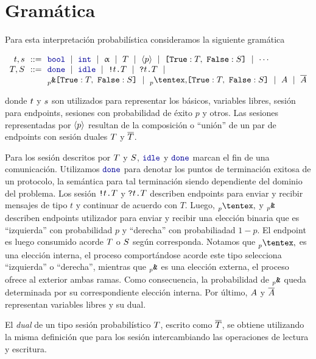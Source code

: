 \section{Gramática}

Para esta interpretación probabilística consideramos la siguiente gramática

\[
\begin{array}{@{}r@{~~}c@{~~}l@{}}
\TypeT, \TypeS & ::= &
\tbool
\rulemid \tint
\rulemid \tvar
\rulemid \SessionType
\rulemid \ClosedSessionType
\rulemid \BinaryLabels{\SessionTypeT}{\SessionTypeS}
\rulemid \cdots
\\
\SessionTypeT, \SessionTypeS & ::= &
\Done
\rulemid \Idle
\rulemid \Out\Type\SessionType
\rulemid \In\Type\SessionType
\rulemid
\\
	& &
\BinaryPBranch[p]\SessionTypeT\SessionTypeS
\rulemid \BinaryPChoice[p]\SessionTypeT\SessionTypeS
\rulemid \etvarA
\rulemid \dual\etvarA
\end{array}
\]

donde $t$ y $s$ son utilizados para representar los  básicos,
variables libres,  sesión para endpoints, sesiones con probabilidad de
éxito $p$ y otros. Las sesiones representadas por $\langle p \rangle$ resultan
de la composición o ``unión'' de un par de endpoints con  sesión duales
$T$ y $\overline{T}$.

Para los  sesión descritos por $T$ y $S$, $\Idle$
y $\Done$ marcan el fin de una comunicación. Utilizamos $\Done$ para denotar
los puntos de terminación exitosa de un protocolo, la semántica para tal
terminación siendo dependiente del dominio del problema. Los  sesión
${\texttt{\upshape!}}{t}\texttt{\upshape.}T$ y ${\texttt{\upshape?}}{t}\texttt{\upshape.}T$ describen endpoints para
enviar y recibir mensajes de tipo $t$ y continuar de acuerdo con $T$. Luego,
$\PChoice$ y
$\PBranch$ describen endpoints utilizador para
enviar y recibir una elección binaria que es ``izquierda'' con probabilidad $p$
y ``derecha'' con probabiliadad $1 - p$. El endpoint es luego consumido acorde
$T$ o $S$ según corresponda. Notamos que $\PChoice{}{}$
es una elección interna, el proceso comportándose acorde este tipo selecciona
``izquierda'' o ``derecha'', mientras que $\PBranch$ es una elección
externa, el proceso ofrece al exterior ambas ramas. Como consecuencia, la
probabilidad de $\PBranch$ queda determinada por su correspondiente
elección interna. Por último, $A$ y $\overline{A}$ representan variables
libres y su dual.

El \emph{dual} de un tipo sesión probabilístico $T$, escrito como
$\overline{T}$, se obtiene utilizando la misma definición que para los
 sesión intercambiando las operaciones de lectura y escritura.

